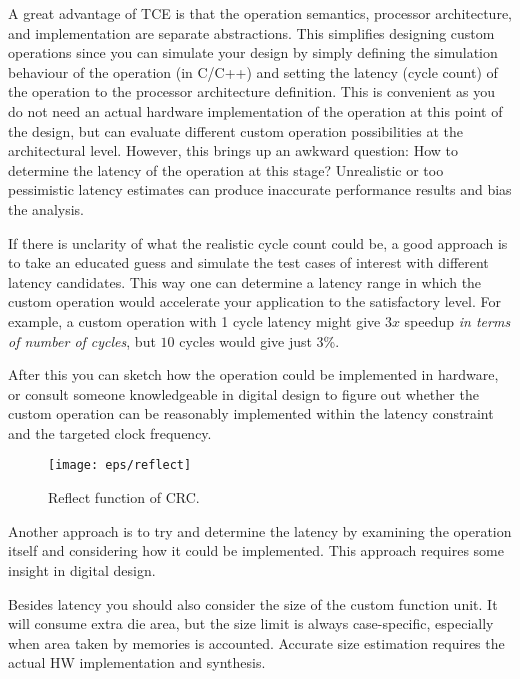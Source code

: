 \documentclass[twoside]{tceusermanual}
\begin{document}

A great advantage of TCE is that the operation semantics, processor
architecture, and implementation are separate abstractions. This
simplifies designing custom operations since you can simulate your
design by simply defining the simulation behaviour of the operation (in C/C++)
and setting the latency (cycle count) of the operation to the processor architecture
definition. This is convenient as you do not need an actual hardware
implementation of the operation at this point of the design, but can
evaluate different custom operation possibilities at the architectural
level. However, this brings up an awkward question: How to determine
the latency of the operation at this stage? Unrealistic or too pessimistic
latency estimates can produce inaccurate performance results and bias the
analysis.

If there is unclarity of what the realistic cycle count could be,
a good approach is to take an educated guess and simulate the
test cases of interest with different latency candidates. This way
one can determine a latency range in which the custom operation would
accelerate your application to the satisfactory level. For example,
a custom operation with 1 cycle latency might give $3x$ speedup \textit{in
terms of number of cycles}, but $10$ cycles would give just 3\%.

After this you can sketch how the operation could be implemented in
hardware, or consult someone knowledgeable in digital design to figure
out whether the custom operation can be reasonably implemented within
the latency constraint and the targeted clock frequency.

\begin{figure}
  \begin{center} \texttt{[image: eps/reflect]}
  \caption{Reflect function of CRC.}
  \label{fig:reflect} \end{center}
\end{figure}

Another approach is to try and determine the latency by examining the
operation itself and considering how it could be implemented. This
approach requires some insight in digital design.

Besides latency you should also consider the size of the custom
function unit.  It will consume extra die area, but the size limit is
always case-specific, especially when area taken by memories is
accounted. Accurate size estimation requires the actual HW
implementation and synthesis.
\end{document}

